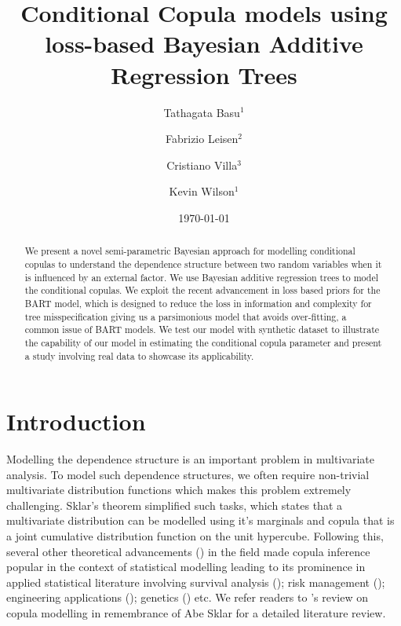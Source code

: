 \documentclass{amsart}
\title{Conditional Copula models using loss-based Bayesian Additive Regression Trees}
\author{Tathagata Basu$^1$}
\author{Fabrizio Leisen$^2$}
\author{Cristiano Villa$^3$}
\author{Kevin Wilson$^1$}
\date{\today}
\begin{document}
\begin{abstract}
	 We present a novel semi-parametric Bayesian approach for modelling conditional copulas to understand the dependence structure between two random variables when it is influenced by an external factor. We use Bayesian additive regression trees to model the conditional copulas. We exploit the recent advancement in loss based priors for the BART model, which is designed to reduce the loss in information and complexity for tree misspecification giving us a parsimonious model that avoids over-fitting, a common issue of BART models. We test our model with synthetic dataset to illustrate the capability of our model in estimating the conditional copula parameter and present a study involving real data to showcase its applicability.
\end{abstract}


\maketitle

\section{Introduction}
Modelling the dependence structure is an important problem in multivariate analysis. To model such dependence structures, we often require non-trivial multivariate distribution functions which makes this problem extremely challenging. Sklar's theorem\cite{sklar:1959} simplified such tasks, which states that a multivariate distribution can be modelled using it's marginals and copula that is a joint cumulative distribution function on the unit hypercube. Following this, several other theoretical advancements (\citet{kimeldori1975uniform,ruschendorf1976,schweizer1981,Genest01091993,Genest1993mult}) in the field made copula inference popular in the context of statistical modelling leading to its prominence in applied statistical literature involving  survival analysis (\citet 	{clayton1978model,oakes1989bivariate,zheng1995estimates,shih1995inferences,braekers2005copula}); risk management (\citet{fama1993common,BURGERT2006289,engle1990asset}); engineering applications (\citet{salvadori2007use,aghakouchak2010copula}); genetics (\citet{li2006quantitative}) etc. We refer readers to \citet{GENEST2024105278}'s review on copula modelling in remembrance of Abe Sklar for a detailed literature review.
\end{document}
